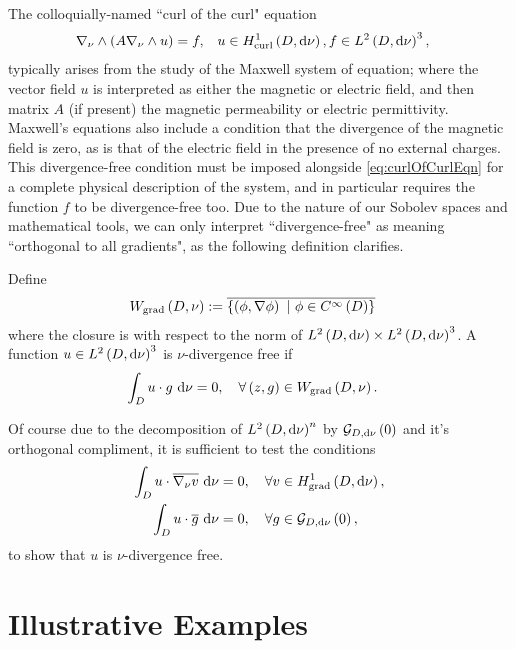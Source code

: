 The colloquially-named ``curl of the curl" equation 
\begin{align} \label{eq:curlOfCurlEqn}
	\nabla_{\nu}\wedge\left( A\nabla_{\nu}\wedge u \right) = f, &\quad u\in H^1_\mathrm{curl}\left( D, \mathrm{d}\nu \right), f\in L^{2}\left( D,\mathrm{d}\nu \right)^3,
\end{align}
typically arises from the study of the Maxwell system of equation; where the vector field $u$ is interpreted as either the magnetic or electric field, and then matrix $A$ (if present) the magnetic permeability or electric permittivity.
Maxwell's equations also include a condition that the divergence of the magnetic field is zero, as is that of the electric field in the presence of no external charges.
This divergence-free condition must be imposed alongside \eqref{eq:curlOfCurlEqn} for a complete physical description of the system, and in particular requires the function $f$ to be divergence-free too.
Due to the nature of our Sobolev spaces and mathematical tools, we can only interpret ``divergence-free" as meaning ``orthogonal to all gradients", as the following definition clarifies.
\begin{definition}
	Define 
	\begin{align*}
		W_{\mathrm{grad}}\left( D,\nu \right) &:= \overline{\left\{  \left( \phi, \nabla\phi \right) \ \vert \ \phi\in C^{\infty}\left( D \right)  \right\}}
	\end{align*}
	where the closure is with respect to the norm of $L^{2}\left( D,\mathrm{d}\nu \right)\times L^{2}\left( D,\mathrm{d}\nu \right)^3$.
	A function $u\in L^{2}\left( D,\mathrm{d}\nu \right)^3$ is $\nu$-divergence free if
	\begin{align*}
		\int_{D} u\cdot g  \ \mathrm{d}\nu &= 0, \quad \forall \left( z,g \right)\in W_{\mathrm{grad}}\left( D,\nu \right).
	\end{align*}	 
\end{definition}

Of course due to the decomposition of $L^{2}\left( D,\mathrm{d}\nu \right)^n$ by $\mathcal{G}_{ D, \mathrm{d}\nu}\left( 0 \right)$ and it's orthogonal compliment, it is sufficient to test the conditions
\begin{align*}
	\int_{D} u\cdot\overline{\nabla_{\nu}v}  \ \mathrm{d}\nu &= 0, \quad \forall v\in H^1_\mathrm{grad}\left( D, \mathrm{d}\nu \right), \\
	\int_{D} u\cdot\overline{g}  \ \mathrm{d}\nu &= 0, \quad \forall g\in\mathcal{G}_{ D, \mathrm{d}\nu}\left( 0 \right),
\end{align*}
to show that $u$ is $\nu$-divergence free.

\section{Illustrative Examples} \label{sec:CurlExamples}


